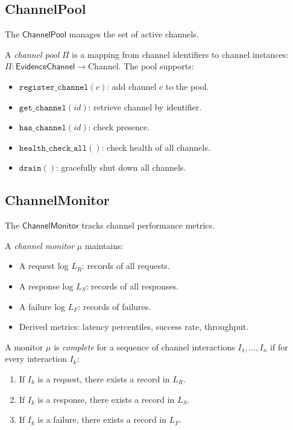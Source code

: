 \documentclass[11pt]{article}
\newcommand{\EvChan}{\mathsf{EvidenceChannel}}
\newcommand{\ChanPool}{\mathsf{ChannelPool}}
\newcommand{\ChanMon}{\mathsf{ChannelMonitor}}
\begin{document}
\subsection{ChannelPool}
\label{sec:infra:pool}

The $\ChanPool$ manages the set of active channels.

\begin{definition}
\label{def:pool}
A \emph{channel pool} $\Pi$ is a mapping from channel identifiers
to channel instances: $\Pi : \EvChan \to \mathrm{Channel}$.
The pool supports:
\begin{itemize}[leftmargin=2em]
\item $\texttt{register\_channel}(c)$: add channel $c$ to the pool.
\item $\texttt{get\_channel}(id)$: retrieve channel by identifier.
\item $\texttt{has\_channel}(id)$: check presence.
\item $\texttt{health\_check\_all}()$: check health of all channels.
\item $\texttt{drain}()$: gracefully shut down all channels.
\end{itemize}
\end{definition}

\subsection{ChannelMonitor}
\label{sec:infra:monitor}

The $\ChanMon$ tracks channel performance metrics.

\begin{definition}
\label{def:monitor}
A \emph{channel monitor} $\mu$ maintains:
\begin{itemize}[leftmargin=2em]
\item A request log $L_R$: records of all requests.
\item A response log $L_S$: records of all responses.
\item A failure log $L_F$: records of failures.
\item Derived metrics: latency percentiles, success rate, throughput.
\end{itemize}
\end{definition}

\begin{definition}
\label{def:monitor-complete}
A monitor $\mu$ is \emph{complete} for a sequence of channel
interactions $I_1, \ldots, I_n$ if for every interaction $I_k$:
\begin{enumerate}
\item If $I_k$ is a request, there exists a record in $L_R$.
\item If $I_k$ is a response, there exists a record in $L_S$.
\item If $I_k$ is a failure, there exists a record in $L_F$.
\end{enumerate}
\end{definition}
\end{document}
